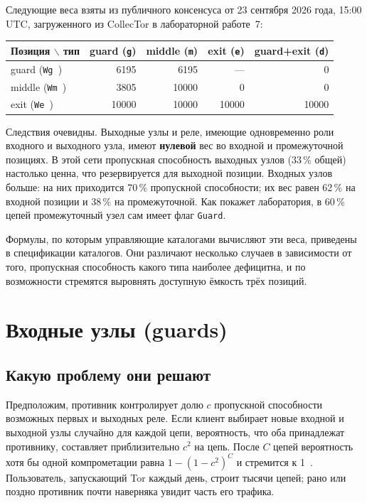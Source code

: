 Следующие веса взяты из публичного консенсуса от 23 сентября 2026 года, 15:00 UTC, загруженного из CollecTor в лабораторной работе~7:
\begin{center}
\begin{tabular}{lrrrr}
\toprule
Позиция $\backslash$ тип & guard (\texttt{g}) & middle (\texttt{m}) & exit (\texttt{e}) & guard+exit (\texttt{d}) \\
\midrule
guard (\texttt{Wg\,}) & 6195 & 6195 & --- & 0 \\
middle (\texttt{Wm\,}) & 3805 & 10000 & 0 & 0 \\
exit (\texttt{We\,}) & 10000 & 10000 & 10000 & 10000 \\
\bottomrule
\end{tabular}
\end{center}
Следствия очевидны. Выходные узлы и реле, имеющие одновременно роли входного и выходного узла, имеют \textbf{нулевой} вес во входной и промежуточной позициях. В этой сети пропускная способность выходных узлов (33\,\% общей) настолько ценна, что резервируется для выходной позиции. Входных узлов больше: на них приходится 70\,\% пропускной способности; их вес равен 62\,\% на входной позиции и 38\,\% на промежуточной. Как покажет лаборатория, в 60\,\% цепей промежуточный узел сам имеет флаг \texttt{Guard}.

Формулы, по которым управляющие каталогами вычисляют эти веса, приведены в спецификации каталогов. Они различают несколько случаев в зависимости от того, пропускная способность какого типа наиболее дефицитна, и по возможности стремятся выровнять доступную ёмкость трёх позиций.

\section{Входные узлы (guards)}\label{sec:guard}

\subsection{Какую проблему они решают}

Предположим, противник контролирует долю $c$ пропускной способности возможных первых и выходных реле. Если клиент выбирает новые входной и выходной узлы случайно для каждой цепи, вероятность, что оба принадлежат противнику, составляет приблизительно $c^2$ на цепь. После $C$ цепей вероятность хотя бы одной компрометации равна $1 - (1 - c^2)^C$ и стремится к 1~. Пользователь, запускающий Tor каждый день, строит тысячи цепей; рано или поздно противник почти наверняка увидит часть его трафика.

